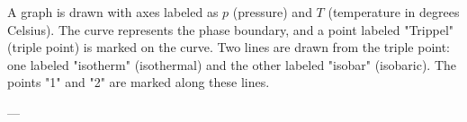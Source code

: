 A graph is drawn with axes labeled as \( p \) (pressure) and \( T \) (temperature in degrees Celsius). The curve represents the phase boundary, and a point labeled "Trippel" (triple point) is marked on the curve. Two lines are drawn from the triple point: one labeled "isotherm" (isothermal) and the other labeled "isobar" (isobaric). The points "1" and "2" are marked along these lines.

---